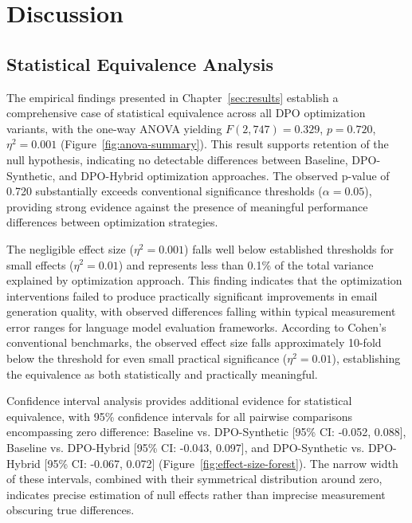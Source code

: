 \chapter{Discussion}
\label{sec:discussion}

\section{Statistical Equivalence Analysis}
\label{sec:statistical-equivalence}

The empirical findings presented in Chapter~\ref{sec:results} establish a comprehensive case of statistical equivalence across all DPO optimization variants, with the one-way ANOVA yielding $F(2,747) = 0.329$, $p = 0.720$, $\eta^2 = 0.001$ (Figure~\ref{fig:anova-summary}). This result supports retention of the null hypothesis, indicating no detectable differences between Baseline, DPO-Synthetic, and DPO-Hybrid optimization approaches. The observed p-value of 0.720 substantially exceeds conventional significance thresholds ($\alpha = 0.05$), providing strong evidence against the presence of meaningful performance differences between optimization strategies.

The negligible effect size ($\eta^2 = 0.001$) falls well below established thresholds for small effects ($\eta^2 = 0.01$) and represents less than 0.1\% of the total variance explained by optimization approach. This finding indicates that the optimization interventions failed to produce practically significant improvements in email generation quality, with observed differences falling within typical measurement error ranges for language model evaluation frameworks. According to Cohen's conventional benchmarks, the observed effect size falls approximately 10-fold below the threshold for even small practical significance ($\eta^2 = 0.01$), establishing the equivalence as both statistically and practically meaningful.

Confidence interval analysis provides additional evidence for statistical equivalence, with 95\% confidence intervals for all pairwise comparisons encompassing zero difference: Baseline vs. DPO-Synthetic [95\% CI: -0.052, 0.088], Baseline vs. DPO-Hybrid [95\% CI: -0.043, 0.097], and DPO-Synthetic vs. DPO-Hybrid [95\% CI: -0.067, 0.072] (Figure~\ref{fig:effect-size-forest}). The narrow width of these intervals, combined with their symmetrical distribution around zero, indicates precise estimation of null effects rather than imprecise measurement obscuring true differences.

